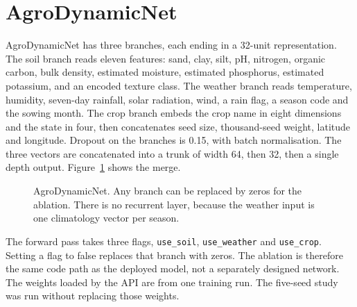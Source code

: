 \section{AgroDynamicNet}
AgroDynamicNet has three branches, each ending in a 32-unit representation. The soil branch reads eleven features: sand, clay, silt, pH, nitrogen, organic carbon, bulk density, estimated moisture, estimated phosphorus, estimated potassium, and an encoded texture class. The weather branch reads temperature, humidity, seven-day rainfall, solar radiation, wind, a rain flag, a season code and the sowing month. The crop branch embeds the crop name in eight dimensions and the state in four, then concatenates seed size, thousand-seed weight, latitude and longitude. Dropout on the branches is 0.15, with batch normalisation. The three vectors are concatenated into a trunk of width 64, then 32, then a single depth output. Figure~\ref{fig:net} shows the merge.

\begin{figure}[H]
\centering
{}
\caption{AgroDynamicNet. Any branch can be replaced by zeros for the ablation. There is no recurrent layer, because the weather input is one climatology vector per season.}
\label{fig:net}
\end{figure}

The forward pass takes three flags, \texttt{use\_soil}, \texttt{use\_weather} and \texttt{use\_crop}. Setting a flag to false replaces that branch with zeros. The ablation is therefore the same code path as the deployed model, not a separately designed network. The weights loaded by the API are from one training run. The five-seed study was run without replacing those weights.

